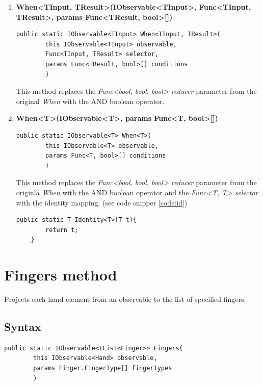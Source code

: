 \documentclass[12pt,a4paper,twoside]{report}
\begin{document}
\begin{enumerate}
    \item \textbf{When<TInput, TResult>(IObservable<TInput>, Func<TInput, TResult>, params Func<TResult, bool>[])} \\
\begin{lstlisting}[caption=Declaration]
    public static IObservable<TInput> When<TInput, TResult>(
        this IObservable<TInput> observable,
        Func<TInput, TResult> selector,
        params Func<TResult, bool>[] conditions
        )
\end{lstlisting}
        This method replaces the \textit{Func<bool, bool, bool> reducer} parameter from the original \textit{When} with the AND boolean operator.
    
    \item \textbf{When<T>(IObservable<T>, params Func<T, bool>[])} \\
\begin{lstlisting}[caption=Declaration]
    public static IObservable<T> When<T>(
        this IObservable<T> observable,
        params Func<T, bool>[] conditions
        )
\end{lstlisting}
        This method replaces the \textit{Func<bool, bool, bool> reducer} parameter from the originla \textit{When} with the AND boolean operator and the \textit{Func<T, T> selector} with the identity mapping. (see code snipper \ref{code:id})
        \\
\begin{lstlisting}[caption=Identity mapping, label=code:id]
    public static T Identity<T>(T t){
        return t;
    }
\end{lstlisting}
\end{enumerate}

\section{Fingers method}
Projects each hand element from an observable to the list of specified fingers.

\subsection{Syntax}
\begin{lstlisting}[caption=Declaration]
    public static IObservable<IList<Finger>> Fingers(
        this IObservable<Hand> observable,
        params Finger.FingerType[] fingerTypes
        )
\end{lstlisting}
\end{document}
